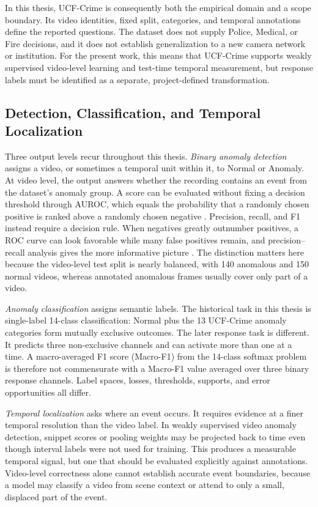 In this thesis, UCF-Crime is consequently both the empirical domain and a scope
boundary. Its video identities, fixed split, categories, and temporal annotations
define the reported questions. The dataset does not supply Police, Medical, or
Fire decisions, and it does not establish generalization to a new camera network
or institution. For the present work, this means that UCF-Crime supports weakly supervised video-level learning and test-time temporal
measurement, but response labels must be identified as a separate,
project-defined transformation.

\subsection{Detection, Classification, and Temporal Localization}

Three output levels recur throughout this thesis. \emph{Binary anomaly
detection} assigns a video, or sometimes a temporal unit within it, to Normal or
Anomaly. At video level, the output answers whether the recording contains an
event from the dataset's anomaly group. A score can be evaluated without fixing
a decision threshold through AUROC, which equals the probability that a randomly
chosen positive is ranked above a randomly chosen negative
\cite{fawcett2006introduction}. Precision, recall, and F1 instead require a
decision rule. When negatives greatly outnumber positives, a ROC curve can look
favorable while many false positives remain, and precision--recall analysis
gives the more informative picture
\cite{davis2006relationship,saito2015precision}. The distinction matters here
because the video-level test split is nearly balanced, with 140 anomalous and
150 normal videos, whereas annotated anomalous frames usually cover only part
of a video.

\emph{Anomaly classification} assigns semantic labels. The historical task in
this thesis is single-label 14-class classification: Normal plus the 13
UCF-Crime anomaly categories form mutually exclusive outcomes. The later
response task is different. It predicts three non-exclusive channels and can
activate more than one at a time. A macro-averaged F1 score (Macro-F1) from the
14-class softmax problem is therefore not commensurate with a Macro-F1 value
averaged over three
binary response channels. Label spaces, losses, thresholds, supports, and error
opportunities all differ.

\emph{Temporal localization} asks where an event occurs. It requires evidence
at a finer temporal resolution than the video label. In weakly supervised video
anomaly detection, snippet scores or pooling weights may be projected back to
time even though interval labels were not used for training. This produces a
measurable temporal signal, but one that should be evaluated explicitly against
annotations. Video-level correctness alone cannot establish accurate event
boundaries, because a model may classify a video from scene context or attend to
only a small, displaced part of the event.


